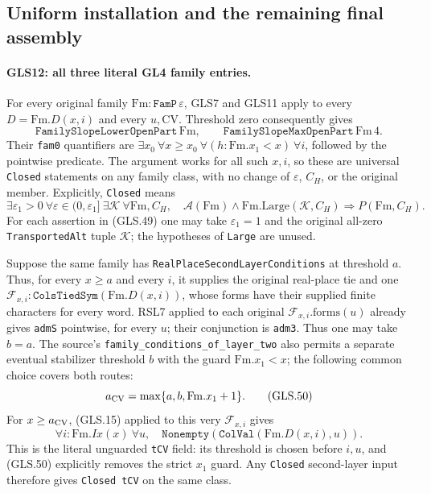 \subsection{Uniform installation and the remaining final assembly}

\paragraph{GLS12: all three literal GL4 family entries.}
\label{claim:GLS12}
For every original family $\mathrm{Fm}:\texttt{FamP}\,\varepsilon$,
GLS7 and GLS11 apply to every $D=\mathrm{Fm}.D(x,i)$ and every
$u,\mathrm{CV}$.  Threshold zero consequently gives
\[
 \texttt{FamilySlopeLowerOpenPart}\,\mathrm{Fm},\qquad
 \texttt{FamilySlopeMaxOpenPart}\,\mathrm{Fm}\,4.
 \tag{GLS.49}
\]
Their \texttt{fam0} quantifiers are
$\exists x_0\ \forall x\ge x_0\ \forall (h:\mathrm{Fm}.x_1<x)
\ \forall i$, followed by the pointwise predicate.  The argument
works for all such $x,i$, so these are universal \texttt{Closed}
statements on any family class, with no change of $\varepsilon$,
$C_H$, or the original member.
Explicitly, \texttt{Closed} means
\[
 \exists\varepsilon_1>0\ \forall\varepsilon\in(0,\varepsilon_1]
 \ \exists\mathcal K\ \forall\mathrm{Fm},C_H,\quad
 \mathcal A(\mathrm{Fm})\wedge\mathrm{Fm}.\mathrm{Large}(\mathcal K,C_H)
       \Longrightarrow P(\mathrm{Fm},C_H).
\]
For each assertion in (GLS.49) one may take
$\varepsilon_1=1$ and the original all-zero \texttt{TransportedAlt}
tuple $\mathcal K$; the hypotheses of \texttt{Large} are unused.

Suppose the same family has \texttt{RealPlaceSecondLayerConditions}
at threshold $a$.  Thus, for every $x\ge a$ and every $i$, it
supplies the original real-place tie and one
$\mathcal F_{x,i}:\texttt{ColsTiedSym}(\mathrm{Fm}.D(x,i))$,
whose forms have their supplied finite characters for every word.
RSL7 applied to each original $\mathcal F_{x,i}.\mathrm{forms}(u)$
already gives \texttt{admS} pointwise, for every $u$; their conjunction
is \texttt{adm3}.  Thus one may take $b=a$.  The source's
\texttt{family\_conditions\_of\_layer\_two} also permits a separate
eventual stabilizer threshold $b$ with the guard
$\mathrm{Fm}.x_1<x$; the following common choice covers both routes:
\[
                    a_{\rm CV}=\max\{a,b,\mathrm{Fm}.x_1+1\}.
 \tag{GLS.50}
\]
For $x\ge a_{\rm CV}$, (GLS.15) applied to this very
$\mathcal F_{x,i}$ gives
\[
 \forall i:\mathrm{Fm}.Ix(x)\ \forall u,\quad
            \texttt{Nonempty}(\texttt{ColVal}(\mathrm{Fm}.D(x,i),u)).
 \tag{GLS.51}
\]
This is the literal unguarded \texttt{tCV} field: its threshold
is chosen before $i,u$, and (GLS.50) explicitly removes the strict
$x_1$ guard.  Any \texttt{Closed} second-layer input therefore
gives \texttt{Closed tCV} on the same class.

